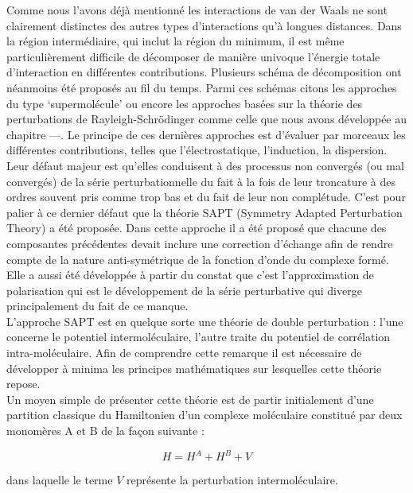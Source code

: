    Comme nous l’avons déjà mentionné les interactions de van der Waals ne sont clairement distinctes des
   autres types d’interactions qu’à longues distances. Dans la région intermédiaire, qui inclut la région du
   minimum, il est même particulièrement difficile de décomposer de manière univoque l’énergie totale d’interaction
   en différentes contributions. Plusieurs schéma de décomposition ont néanmoins été proposés au fil du temps.
   Parmi ces schémas citons les approches du type ‘supermolécule’ ou encore les approches basées sur la théorie des perturbations de Rayleigh-Schr\"{o}dinger comme celle que nous avons développée au chapitre —. 
   Le principe de ces dernières approches est d’évaluer par morceaux les différentes contributions, telles que l’électrostatique, l’induction, la dispersion.
   Leur défaut majeur est qu’elles conduisent à des processus non convergés (ou mal convergés) de la série perturbationnelle du fait à la fois de leur troncature à des ordres souvent pris comme trop bas 
   et du fait de leur non complétude.
   C’est pour palier à ce dernier défaut que la théorie SAPT (Symmetry Adapted Perturbation Theory) a été proposée.  
   Dans cette approche il a été proposé que chacune des composantes précédentes devait inclure une correction d’échange afin de rendre compte de la nature anti-symétrique de la fonction d’onde du complexe formé. Elle a aussi été développée à partir du constat que c’est l’approximation de polarisation qui est le développement de la série perturbative qui diverge principalement du fait de ce manque.\\
   
   
   L’approche SAPT est en quelque sorte une théorie de double perturbation : 
   l’une concerne le potentiel intermoléculaire,
   l’autre traite du potentiel de corrélation intra-moléculaire. 
   Afin de comprendre cette remarque il est nécessaire de développer à minima les principes mathématiques sur lesquelles cette théorie repose.\\
   
   Un moyen simple de présenter cette théorie est de partir initialement d’une partition classique du Hamiltonien
   d'un complexe moléculaire constitué par deux monomères A et B de la façon suivante :
   
   \begin{equation}
   H = H^{A} + H^{B} + V
   \end{equation}
   
   dans laquelle le terme $V$ représente la perturbation intermoléculaire.\\
   
